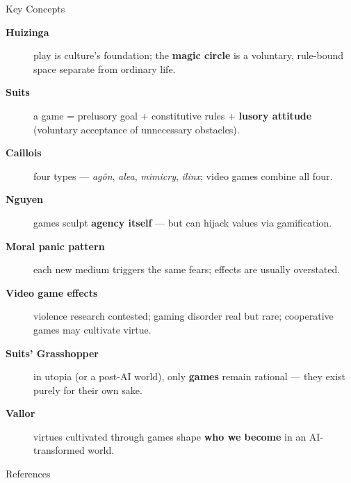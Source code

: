 \documentclass[aspectratio=169,11pt]{beamer}
\begin{document}
\begin{frame}[allowframebreaks]{Key Concepts}
\footnotesize
\begin{description}
    \item[\textbf{Huizinga}] play is culture's foundation; the \textbf{magic circle} is a voluntary, rule-bound space separate from ordinary life.
    \item[\textbf{Suits}] a game = prelusory goal + constitutive rules + \textbf{lusory attitude} (voluntary acceptance of unnecessary obstacles).
    \item[\textbf{Caillois}] four types --- \emph{agôn}, \emph{alea}, \emph{mimicry}, \emph{ilinx}; video games combine all four.
    \item[\textbf{Nguyen}] games sculpt \textbf{agency itself} --- but can hijack values via gamification.
    \item[\textbf{Moral panic pattern}] each new medium triggers the same fears; effects are usually overstated.
    \item[\textbf{Video game effects}] violence research contested; gaming disorder real but rare; cooperative games may cultivate virtue.
    \item[\textbf{Suits' Grasshopper}] in utopia (or a post-AI world), only \textbf{games} remain rational --- they exist purely for their own sake.
    \item[\textbf{Vallor}] virtues cultivated through games shape \textbf{who we become} in an AI-transformed world.
\end{description}
\end{frame}

\begin{frame}[allowframebreaks]{References}
\printbibliography[heading=none]
\end{frame}
\end{document}

